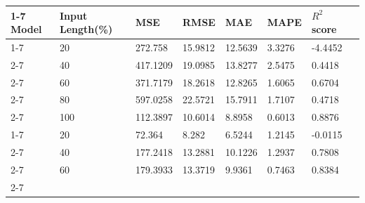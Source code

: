 \documentclass[11pt]{report}
\begin{document}
\begin{table}[H]
	\begin{center}
	\vspace{0.5cm}
	\begin{tabular}{|l|l|l|l|l|l|l|l}
		\cline{1-7}
		\cellcolor[HTML]{C0C0C0}Model   & \cellcolor[HTML]{C0C0C0}Input Length(\%) & \cellcolor[HTML]{C0C0C0}MSE & \cellcolor[HTML]{C0C0C0}RMSE & \cellcolor[HTML]{C0C0C0}MAE & \cellcolor[HTML]{C0C0C0}MAPE & \cellcolor[HTML]{C0C0C0}$R^2$score &  \\ \cline{1-7}
										& 20                                       & 272.758                     & 15.9812                      & 12.5639                     & 3.3276                       & -4.4452                                               &  \\ \cline{2-7}
										& 40                                       & 417.1209                    & 19.0985                      & 13.8277                     & 2.5475                       & 0.4418                                                &  \\ \cline{2-7}
										& 60                                       & 371.7179                    & 18.2618                      & 12.8265                     & 1.6065                       & 0.6704                                                &  \\ \cline{2-7}
										& 80                                       & 597.0258                    & 22.5721                      & 15.7911                     & 1.7107                       & 0.4718                                                &  \\ \cline{2-7}
		\multirow{-5}{*}{S-LWR} & 100                                      & 112.3897                    & 10.6014                      & 8.8958                      & 0.6013                       & 0.8876                                                &  \\ \cline{1-7}
										& 20                                       & 72.364                      & 8.282                        & 6.5244                      & 1.2145                       & -0.0115                                               &  \\ \cline{2-7}
										& 40                                       & 177.2418                    & 13.2881                      & 10.1226                     & 1.2937                       & 0.7808                                                &  \\ \cline{2-7}
										& 60                                       & 179.3933                    & 13.3719                      & 9.9361                      & 0.7463                       & 0.8384                                                &  \\ \cline{2-7}

\end{tabular}
\end{center}
\end{table}
\end{document}
